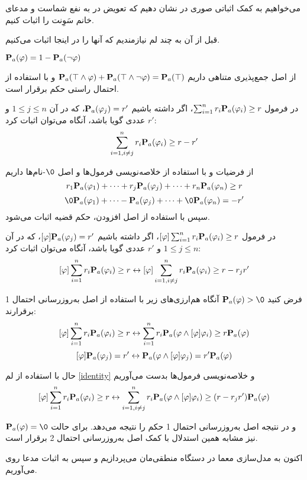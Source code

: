 می‌خواهیم به کمک اثباتی صوری در  نشان ‌دهیم که تعویض در به نفع شماست و مدعای خانم سَوِنت را اثبات کنیم.

قبل از آن به چند لم نیازمندیم که آنها را در اینجا اثبات می‌کنیم.

\begin{lemma}\label{negP}
$ \mathbf{P}_a(\varphi)=1-\mathbf{P}_a(\neg\varphi) $
\end{lemma}
\bp
از اصل جمع‌پذیری متناهی داریم
$ \mathbf{P}_a(\top\wedge\varphi)+\mathbf{P}_a(\top\wedge\neg\varphi)=\mathbf{P}_a(\top) $
و با استفاده از احتمال راستی حکم برقرار است.
\ep
\begin{lemma}\label{identity2}
در فرمول $ \sum_{i=1}^n r_i\mathbf{P}_a(\varphi_i)\geq r $، اگر داشته باشیم   $  \mathbf{P}_a(\varphi_j)=r' $، که در آن $ 1\leq j\leq n $ و $ r' $ عددی گویا باشد، آنگاه می‌توان اثبات کرد:
$$\sum_{i=1 , i\neq j}^n r_i\mathbf{P}_a(\varphi_i)\geq r-r'$$
\end{lemma}
\bp
از فرضیات و با استفاده از خلاصه‌نویسی فرمول‌ها و اصل $\0 $-نام‌ها داریم
$$r_1\mathbf{P}_a(\varphi_1) +\cdots +r_j\mathbf{P}_a(\varphi_j) +\cdots+r_n\mathbf{P}_a(\varphi_n)\geq r$$
$$\0\mbP_a(\varphi_1)+\cdots-\mbP_a(\varphi_j) +\cdots+\0\mbP_a(\varphi_n)=-r'$$
سپس با استفاده از اصل افزودن، حکم قضیه اثبات می‌شود.
\ep
\begin{lemma}\label{identity3}
در فرمول $ [\varphi]\sum_{i=1}^n r_i\mathbf{P}_a(\varphi_i)\geq r $، اگر داشته باشیم   $  [\varphi]\mathbf{P}_a(\varphi_j)=r' $، که در آن $ 1\leq j\leq n $ و $ r' $ عددی گویا باشد، آنگاه می‌توان اثبات کرد:
$$[\varphi]\sum_{i=1}^n r_i\mathbf{P}_a(\varphi_i)\geq r\leftrightarrow[\varphi]\sum_{i=1,i\neq j}^n r_i\mathbf{P}_a(\varphi_i)\geq r-r_j r'$$
\end{lemma}
\bp
فرض کنید $ \mbP_a(\varphi)>\0 $ آنگاه هم‌ارزی‌های زیر با استفاده از اصل به‌روزرسانی احتمال 1 برقرارند:
$$[\varphi]\sum_{i=1}^n r_i\mathbf{P}_a(\varphi_i)\geq r\leftrightarrow\sum_{i=1}^n r_i\mathbf{P}_a(\varphi\wedge[\varphi]\varphi_i)\geq r\mathbf{P}_a(\varphi)$$
$$[\varphi]\mathbf{P}_a(\varphi_j)=r'\leftrightarrow\mathbf{P}_a(\varphi\wedge[\varphi]\varphi_j)=r'\mathbf{P}_a(\varphi)$$

حال با استفاده از لم \ref{identity} و خلاصه‌نویسی فرمول‌ها بدست می‌آوریم
$$[\varphi]\sum_{i=1}^n r_i\mathbf{P}_a(\varphi_i)\geq r\leftrightarrow\sum_{i=1,i\neq j}^n r_i\mathbf{P}_a(\varphi\wedge[\varphi]\varphi_i)\geq (r-r_j r')\mathbf{P}_a(\varphi)$$

و در نتیجه اصل به‌روزرسانی احتمال 1 حکم را نتیجه می‌دهد. برای حالت $ \mbP_a(\varphi)=\0 $ نیز مشابه همین استدلال با کمک اصل به‌روزرسانی احتمال 2 برقرار است.
\ep

اکنون به مدل‌سازی معما در دستگاه منطقی‌مان می‌پردازیم و سپس به اثبات مدعا روی می‌آوریم.

